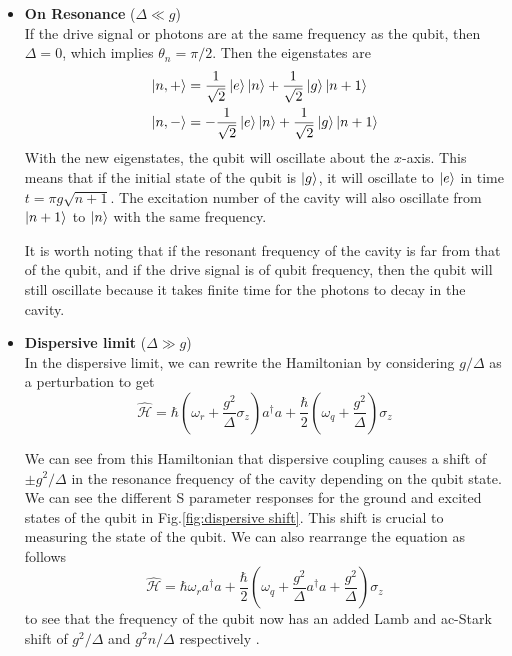\begin{itemize}
\item \textbf{On Resonance} ($\Delta\ll g$)\\
If the drive signal or photons are at the same frequency as the qubit, then $\Delta=0$, which implies $\theta_n=\pi/2$. Then the eigenstates are
\begin{subequations}
\label{eqn:delta zero eigenstates}
\begin{align}
\ket{n,+} &= \frac{1}{\sqrt{2}}\ket{e}\ket{n}+\frac{1}{\sqrt{2}}\ket{g}\ket{n+1}\\
\ket{n,-} &= -\frac{1}{\sqrt{2}}\ket{e}\ket{n}+\frac{1}{\sqrt{2}}\ket{g}\ket{n+1}
\end{align}
\end{subequations}
With the new eigenstates, the qubit will oscillate about the $x$-axis. This means that if the initial state of the qubit is $\ket{g}$, it will oscillate to $\ket{e}$ in time $t=\pi g\sqrt{n+1}$. The excitation number of the cavity will also oscillate from $\ket{n+1}$ to $\ket{n}$ with the same frequency.


It is worth noting that if the resonant frequency of the cavity is far from that of the qubit, and if the drive signal is of qubit frequency, then the qubit will still oscillate because it takes finite time for the photons to decay in the cavity.

\item \textbf{Dispersive limit} ($\Delta\gg g$)\\
In the dispersive limit, we can rewrite the Hamiltonian by considering $g/\Delta$ as a perturbation \cite{Schuster2007} to get
\begin{equation}
\hat{\mathcal{H}}=\hbar\left(\omega_r+\frac{g^2}{\Delta}\sigma_z\right)a^\dag a+\frac{\hbar}{2}\left(\omega_q+\frac{g^2}{\Delta}\right)\sigma_z
\label{eqn:dispersive hamiltonian}
\end{equation}


We can see from this Hamiltonian that dispersive coupling causes a shift of $\pm g^2/\Delta$ in the resonance frequency of the cavity depending on the qubit state. We can see the different S parameter responses for the ground and excited states of the qubit in Fig.\ref{fig:dispersive shift}. This shift is crucial to measuring the state of the qubit.
We can also rearrange the equation as follows
\begin{equation}
\hat{\mathcal{H}}=\hbar\omega_r a^\dag a+\frac{\hbar}{2}\left(\omega_q+\frac{g^2}{\Delta}a^\dag a+\frac{g^2}{\Delta}\right)\sigma_z
\end{equation}
to see that the frequency of the qubit now has an added Lamb and ac-Stark shift of $g^2/\Delta$ and $g^2n/\Delta$ respectively \cite{Blais2004}.


\end{itemize}
